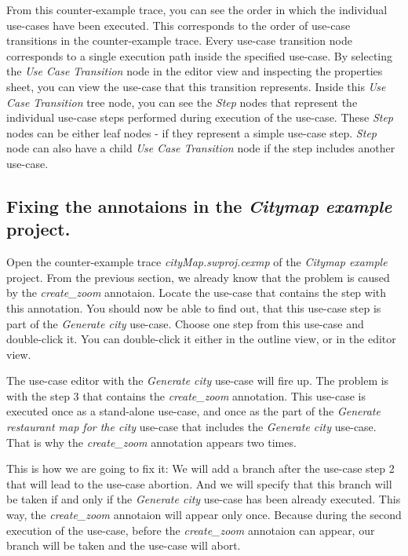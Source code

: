 From this counter-example trace, you can see the order in which the individual use-cases have been executed. This corresponds to the
order of use-case transitions in the counter-example trace. Every use-case transition node corresponds to a single execution path inside
the specified use-case. By selecting the \emph{Use Case Transition} node in the editor view and inspecting the properties sheet, you can
view the use-case that this transition represents. Inside this \emph{Use Case Transition} tree node, you can see the \emph{Step} nodes
that represent the individual use-case steps performed during execution of the use-case. These \emph{Step} nodes can be either leaf
nodes - if they represent a simple use-case step. \emph{Step} node can also have a child \emph{Use Case Transition} node if the step
includes another use-case.

\subsection{Fixing the annotaions in the \emph{Citymap example} project.}

Open the counter-example trace \emph{cityMap.swproj.cexmp} of the \emph{Citymap example} project. From the previous section, we already
know that the problem is caused by the \emph{create\_zoom} annotaion. Locate the use-case that contains the step with this annotation.
You should now be able to find out, that this use-case step is part of the \emph{Generate city} use-case. Choose one step from this
use-case and double-click it. You can double-click it either in the outline view, or in the editor view.

The use-case editor with the \emph{Generate city} use-case will fire up. The problem is with the step 3 that contains the \emph{create\_zoom}
annotation. This use-case is executed once as a stand-alone use-case, and once as the part of the \emph{Generate restaurant map for
the city} use-case that includes the \emph{Generate city} use-case. That is why the \emph{create\_zoom} annotation appears two times.

This is how we are going to fix it: We will add a branch after the use-case step 2 that will lead to the use-case abortion. And we will
specify that this branch will be taken if and only if the \emph{Generate city} use-case has been already executed. This way,
the \emph{create\_zoom} annotaion will appear only once. Because during the second execution of the use-case, before the
\emph{create\_zoom} annotaion can appear, our branch will be taken and the use-case will abort.

